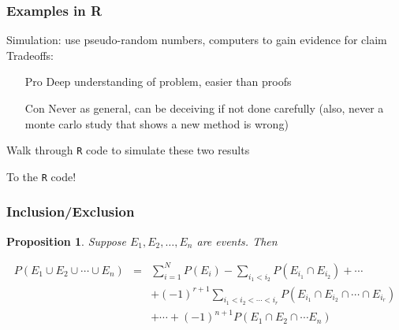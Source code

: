 \documentclass{beamer}
\newtheorem{prop}{Proposition}
\numberwithin{equation}{section}
\begin{document}
\begin{frame}
\frametitle{Examples in R} 

\alert{Simulation}: use pseudo-random numbers, computers to gain evidence for claim\\
Tradeoffs:
\begin{itemize}
\item[Pro] Deep understanding of problem, easier than proofs
\item[Con] Never as general, can be deceiving if not done carefully (also, never a monte carlo study that shows a new method is wrong)
\end{itemize}


Walk through {\tt R} code to simulate these two results


\end{frame}

\begin{frame}

\large
To the {\tt R} code!


\end{frame}



\begin{frame}








\end{frame}




\begin{frame}
\frametitle{Inclusion/Exclusion}

\begin{prop} 
Suppose $E_{1}, E_{2}, \hdots, E_{n}$ are events.  Then 

\begin{eqnarray}
P(E_{1} \cup E_{2} \cup \cdots \cup E_{n} ) & = & \sum_{i=1}^{N} P(E_{i} ) - \sum_{i_{1} <i_{2} } P(E_{i_{1}} \cap E_{i_{2} } )+ \cdots \nonumber \\
& & + (-1)^{r+ 1} \sum_{i_{1}<i_{2} < \cdots< i_{r} } P(E_{i_{1}} \cap E_{i_{2}}\cap \cdots \cap E_{i_{r}} ) \nonumber \\
& & + \cdots + (-1)^{n+1} P(E_{1} \cap E_{2} \cap \cdots E_{n} ) \nonumber 
\end{eqnarray}
\end{prop}

\end{frame}
\end{document}
